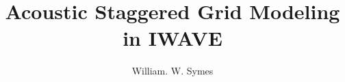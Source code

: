 
\title{Acoustic Staggered Grid Modeling in IWAVE}
\author{William. W. Symes} 
\address{The Rice Inversion Project \\
Department of Computational and Applied Mathematics \\
Rice University \\
Houston TX 77251-1892 USA \\
email {\tt symes@caam.rice.edu}.}



\maketitle



%

